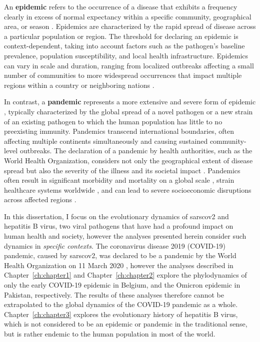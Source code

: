 An \textbf{epidemic} refers to the occurrence of a disease that exhibits a frequency clearly in excess of normal expectancy within a specific community, geographical area, or season \citep{morens2009pandemic}.
Epidemics are characterized by the rapid spread of disease across a particular population or region.
The threshold for declaring an epidemic is context-dependent, taking into account factors such as the pathogen's baseline prevalence, population susceptibility, and local health infrastructure.
Epidemics can vary in scale and duration, ranging from localized outbreaks affecting a small number of communities \citep{moncla2021repeated} to more widespread occurrences that impact multiple regions within a country or neighboring nations \citep{dudas2017virus}.

In contrast, a \textbf{pandemic} represents a more extensive and severe form of epidemic \citep{morens2009pandemic}, typically characterized by the global spread of a novel pathogen or a new strain of an existing pathogen to which the human population has little to no preexisting immunity.
Pandemics transcend international boundaries, often affecting multiple continents simultaneously and causing sustained community-level outbreaks.
The declaration of a pandemic by health authorities, such as the World Health Organization, considers not only the geographical extent of disease spread but also the severity of the illness and its societal impact \citep{world2009pandemic}.
Pandemics often result in significant morbidity and mortality on a global scale \citep{Morens2007}, strain healthcare systems worldwide \citep{kaye2021economic}, and can lead to severe socioeconomic disruptions across affected regions \citep{almeida2021impact}.

In this dissertation, I focus on the evolutionary dynamics of \gls{sarscov2} and hepatitis B virus, two viral pathogens that have had a profound impact on human health and society, however the analyses presented herein consider such dynamics in \textit{specific contexts}.
The coronavirus disease 2019 (COVID-19) pandemic, caused by \gls{sarscov2}, was declared to be a pandemic by the World Health Organization on 11 March 2020 \citep{healthorganization2020coronavirus}, however the analyses described in Chapter~\ref{ch:chapter1} and Chapter~\ref{ch:chapter2} explore the phylodynamics of only the early COVID-19 epidemic in Belgium, and the Omicron epidemic in Pakistan, respectively.
The results of these analyses therefore cannot be extrapolated to the global dynamics of the COVID-19 pandemic as a whole.
Chapter~\ref{ch:chapter3} explores the evolutionary history of hepatitis B virus, which is not considered to be an epidemic or pandemic in the traditional sense, but is rather endemic to the human population in most of the world.

